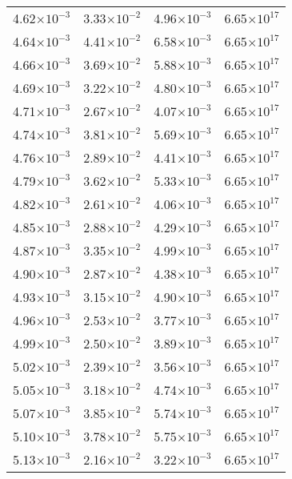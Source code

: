 \documentclass{aa}
\begin{document}
{\begin{longtable}{c|c|c|c}
4.62$\times 10^{-3}$ & 3.33$\times 10^{-2}$ & 4.96$\times 10^{-3}$ & 6.65$\times 10^{17}$  \\
4.64$\times 10^{-3}$ & 4.41$\times 10^{-2}$ & 6.58$\times 10^{-3}$ & 6.65$\times 10^{17}$  \\
4.66$\times 10^{-3}$ & 3.69$\times 10^{-2}$ & 5.88$\times 10^{-3}$ & 6.65$\times 10^{17}$  \\
4.69$\times 10^{-3}$ & 3.22$\times 10^{-2}$ & 4.80$\times 10^{-3}$ & 6.65$\times 10^{17}$  \\
4.71$\times 10^{-3}$ & 2.67$\times 10^{-2}$ & 4.07$\times 10^{-3}$ & 6.65$\times 10^{17}$  \\
4.74$\times 10^{-3}$ & 3.81$\times 10^{-2}$ & 5.69$\times 10^{-3}$ & 6.65$\times 10^{17}$  \\
4.76$\times 10^{-3}$ & 2.89$\times 10^{-2}$ & 4.41$\times 10^{-3}$ & 6.65$\times 10^{17}$  \\
4.79$\times 10^{-3}$ & 3.62$\times 10^{-2}$ & 5.33$\times 10^{-3}$ & 6.65$\times 10^{17}$  \\
4.82$\times 10^{-3}$ & 2.61$\times 10^{-2}$ & 4.06$\times 10^{-3}$ & 6.65$\times 10^{17}$  \\
4.85$\times 10^{-3}$ & 2.88$\times 10^{-2}$ & 4.29$\times 10^{-3}$ & 6.65$\times 10^{17}$  \\
4.87$\times 10^{-3}$ & 3.35$\times 10^{-2}$ & 4.99$\times 10^{-3}$ & 6.65$\times 10^{17}$  \\
4.90$\times 10^{-3}$ & 2.87$\times 10^{-2}$ & 4.38$\times 10^{-3}$ & 6.65$\times 10^{17}$  \\
4.93$\times 10^{-3}$ & 3.15$\times 10^{-2}$ & 4.90$\times 10^{-3}$ & 6.65$\times 10^{17}$  \\
4.96$\times 10^{-3}$ & 2.53$\times 10^{-2}$ & 3.77$\times 10^{-3}$ & 6.65$\times 10^{17}$  \\
4.99$\times 10^{-3}$ & 2.50$\times 10^{-2}$ & 3.89$\times 10^{-3}$ & 6.65$\times 10^{17}$  \\
5.02$\times 10^{-3}$ & 2.39$\times 10^{-2}$ & 3.56$\times 10^{-3}$ & 6.65$\times 10^{17}$  \\
5.05$\times 10^{-3}$ & 3.18$\times 10^{-2}$ & 4.74$\times 10^{-3}$ & 6.65$\times 10^{17}$  \\
5.07$\times 10^{-3}$ & 3.85$\times 10^{-2}$ & 5.74$\times 10^{-3}$ & 6.65$\times 10^{17}$  \\
5.10$\times 10^{-3}$ & 3.78$\times 10^{-2}$ & 5.75$\times 10^{-3}$ & 6.65$\times 10^{17}$  \\
5.13$\times 10^{-3}$ & 2.16$\times 10^{-2}$ & 3.22$\times 10^{-3}$ & 6.65$\times 10^{17}$  \\

\end{longtable}}
\end{document}
